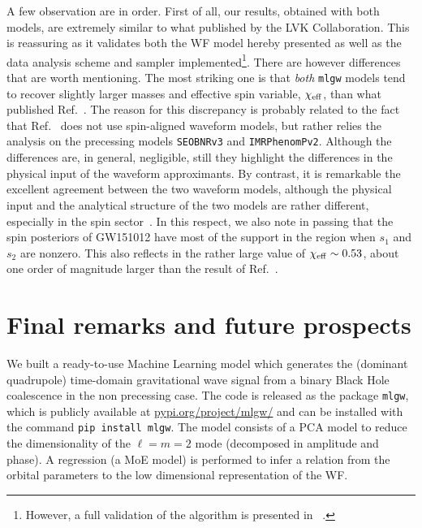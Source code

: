 \documentclass[twocolumn,showpacs,preprintnumbers,nofootinbib,prd,
superscriptaddress,10pt]{revtex4-1}
\begin{document}
A few observation are in order. First of all, our results, obtained with both models,
are extremely similar to what published by the LVK Collaboration. 
This is reassuring as it validates both the WF model hereby presented 
as well as the data analysis scheme and sampler 
implemented\footnote{However, a full validation of the algorithm is presented in ~\cite{gwmodel}.}.
There are however differences that are worth mentioning. The most striking one is that
{\it both} \texttt{mlgw} models tend to recover slightly larger masses and effective 
spin variable, $\chi_{\rm eff}$, than what published Ref.~\cite{LIGOScientific:2018mvr}.
The reason for this discrepancy is probably related to the fact that Ref.~\cite{LIGOScientific:2018mvr}
does not use spin-aligned waveform models, but rather relies the analysis on 
the precessing models \texttt{SEOBNRv3} and \texttt{IMRPhenomPv2}. Although the differences 
are, in general, negligible, still they highlight the differences in the physical input of 
the waveform approximants. By contrast, it is remarkable the excellent agreement between the
two waveform models, although the physical input and the analytical structure of the
two models are rather different, especially in the spin sector~\cite{Rettegno:2019tzh}.
In this respect, we also note in passing that the spin posteriors of GW151012 have
most of the support in the region when $s_1$ and $s_2$ are nonzero. This also
reflects in the rather large value of $\chi_{\rm eff}\sim 0.53$, about one order of magnitude
larger than the result of Ref.~\cite{LIGOScientific:2018mvr}.

\section{Final remarks and future prospects}
\label{sec:end}
We built a ready-to-use Machine Learning model which generates the (dominant quadrupole) time-domain gravitational wave 
signal from a binary Black Hole coalescence in the non precessing case. The code is released as the package \texttt{mlgw}, which is publicly available at 
\href{https://pypi.org/project/mlgw/}{pypi.org/project/mlgw/} and can be installed with the command \texttt{pip install mlgw}.
The model consists of a PCA model to reduce the dimensionality of the $\ell=m=2$ mode (decomposed in amplitude and phase). 
A regression (a MoE model) is performed to infer a relation from the orbital parameters to the low dimensional representation of the WF.
\end{document}

